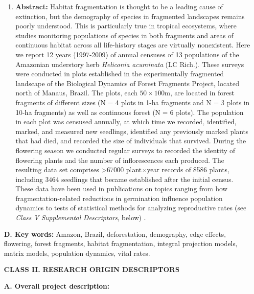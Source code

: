 \documentclass[
  12pt,
  man, donotrepeattitle,floatsintext]{apa6}
\providecommand{\tightlist}{%
  \setlength{\itemsep}{0pt}\setlength{\parskip}{0pt}}
\begin{document}
\begin{enumerate}
\def\labelenumi{\arabic{enumi}.}
\setcounter{enumi}{1}
\tightlist
\item
  \textbf{Abstract:} Habitat fragmentation is thought to be a leading cause of extinction, but the demography of species in fragmented landscapes remains poorly understood. This is particularly true in tropical ecosystems, where studies monitoring populations of species in both fragments and areas of continuous habitat across all life-history stages are virtually nonexistent. Here we report 12 years (1997-2009) of annual censuses of 13 populations of the Amazonian understory herb \emph{Heliconia acuminata} (LC Rich.). These surveys were conducted in plots established in the experimentally fragmented landscape of the Biological Dynamics of Forest Fragments Project, located north of Manaus, Brazil. The plots, each \(50\times100\)m, are located in forest fragments of different sizes (N = 4 plots in 1-ha fragments and N = 3 plots in 10-ha fragments) as well as continuous forest (N = 6 plots). The population in each plot was censused annually, at which time we recorded, identified, marked, and measured new seedlings, identified any previously marked plants that had died, and recorded the size of individuals that survived. During the flowering season we conducted regular surveys to recorded the identity of flowering plants and the number of inflorescences each produced. The resulting data set comprises \textgreater67000 plant\(\times\)year records of 8586 plants, including 3464 seedlings that became established after the initial census. These data have been used in publications on topics ranging from how fragmentation-related reductions in germination influence population dynamics to tests of statistical methods for analyzing reproductive rates (see \emph{Class V Supplemental Descriptors}, below) .
\end{enumerate}

\noindent
\textbf{D. Key words:} Amazon, Brazil, deforestation, demography, edge effects, flowering, forest fragments, habitat fragmentation, integral projection models, matrix models, population dynamics, vital rates.

\noindent 
\textbf{CLASS II. RESEARCH ORIGIN DESCRIPTORS}

\noindent  
\textbf{A. Overall project description:}
\end{document}
